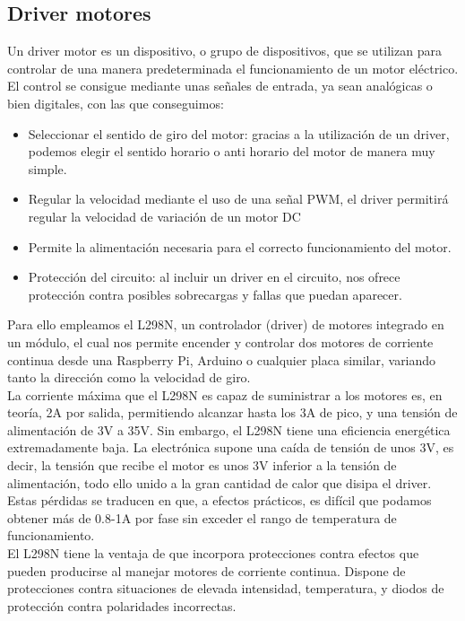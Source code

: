 \subsection{Driver motores}
\label{sec:drivers}

Un driver motor es un dispositivo, o grupo de dispositivos, que se utilizan para controlar de una manera predeterminada el funcionamiento de un motor eléctrico. El control 
se consigue mediante unas señales de entrada, ya sean analógicas o bien digitales, con las que 
conseguimos:

\begin{itemize}
 \item Seleccionar el sentido de giro del motor: gracias a la utilización de un driver, podemos 
elegir el sentido horario o anti horario del motor de manera muy simple.
\item Regular la velocidad mediante el uso de una señal PWM, el driver permitirá regular la velocidad de variación de un motor DC
\item Permite la alimentación necesaria para el correcto funcionamiento del motor.
\item Protección del circuito: al incluir un driver en el circuito, nos ofrece protección contra 
posibles sobrecargas y fallas que puedan aparecer.
\end{itemize}

Para ello empleamos el L298N, un controlador (driver) de motores integrado en un módulo, el cual nos permite encender y controlar dos motores de corriente continua desde una Raspberry Pi, Arduino o
cualquier placa similar, variando tanto la dirección como la velocidad de giro.\\

La corriente máxima que el L298N es capaz de suministrar a los motores es, en teoría, 2A por salida, permitiendo alcanzar hasta los 3A de pico, y una tensión de alimentación de 3V
a 35V. Sin embargo, el L298N tiene una eficiencia energética extremadamente baja. La electrónica supone una caída de tensión de unos 3V, es decir, la tensión que recibe el motor
es unos 3V inferior a la tensión de alimentación, todo ello unido a la gran cantidad de calor que disipa el driver.\\

Estas pérdidas se traducen en que, a efectos prácticos, es difícil que podamos obtener más de 0.8-1A por fase sin exceder el rango de temperatura de funcionamiento.\\

El L298N tiene la ventaja de que incorpora protecciones contra efectos que pueden producirse al manejar motores de corriente continua. Dispone de protecciones contra situaciones
de elevada intensidad, temperatura, y diodos de protección contra polaridades incorrectas.\\


